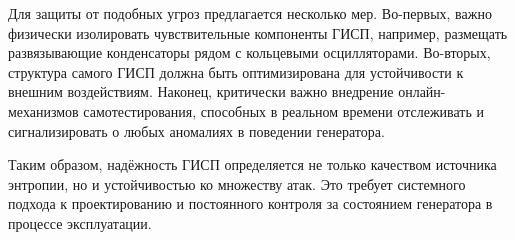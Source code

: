 Для защиты от подобных угроз предлагается несколько мер. Во-первых,
важно физически изолировать чувствительные компоненты ГИСП, например,
размещать развязывающие конденсаторы рядом с кольцевыми осцилляторами.
Во-вторых, структура самого ГИСП должна быть оптимизирована для
устойчивости к внешним воздействиям. Наконец, критически важно внедрение
онлайн-механизмов самотестирования, способных в реальном времени
отслеживать и сигнализировать о любых аномалиях в поведении генератора.

Таким образом, надёжность ГИСП определяется не только качеством
источника энтропии, но и устойчивостью ко множеству атак. Это требует
системного подхода к проектированию и постоянного контроля за состоянием
генератора в процессе эксплуатации.

